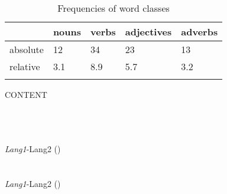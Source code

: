 
\begin{table}
\caption{Frequencies of word classes}
\label{tab:1:frequencies}
 \begin{tabular}{lllll} %
  \lsptoprule
            & nouns & verbs & adjectives & adverbs\\ %
  \midrule
  absolute  &   12 &    34  &    23     & 13\\
  relative  &   3.1 &   8.9 &    5.7    & 3.2\\
  \lspbottomrule
 \end{tabular}
\end{table}








\begin{adjustbox}{max width=0.95\textwidth}
CONTENT
\end{adjustbox}


\begin{exe}\ex\label{ex:} 
    \begin{xlist}
        \ex \gll  \\
         \\
        \glt 	 	\\
        \hspace*{\fill} \textit{Lang1}-Lang2 (\citealt[]{Reference})
        \ex \gll  \\
         \\
        \glt 	 	\\
        \hspace*{\fill} \textit{Lang1}-Lang2 (\citealt[]{Reference})
        \end{xlist}
\end{exe}

